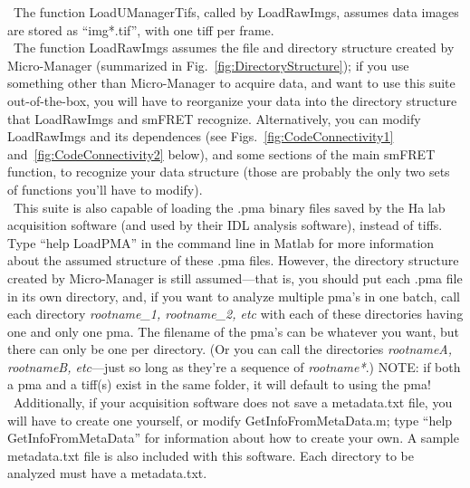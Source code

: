 \documentclass[11pt]{article}
\begin{document}
\noindent \textbullet~The function LoadUManagerTifs, called by LoadRawImgs, assumes data images are stored as ``img*.tif'', with one tiff per frame.\\

\noindent \textbullet~The function LoadRawImgs assumes the file and directory structure created by Micro-Manager (summarized in Fig.~\ref{fig:DirectoryStructure}); if you use something other than Micro-Manager to acquire data, and want to use this suite out-of-the-box, you will have to reorganize your data into the directory structure that LoadRawImgs and smFRET recognize.  Alternatively, you can modify LoadRawImgs and its dependences (see Figs.~\ref{fig:CodeConnectivity1} and~\ref{fig:CodeConnectivity2} below), and some sections of the main smFRET function, to recognize your data structure (those are probably the only two sets of functions you'll have to modify).  \\

\noindent \textbullet~This suite is also capable of loading the .pma binary files saved by the Ha lab acquisition software (and used by their IDL analysis software), instead of tiffs.  Type ``help LoadPMA'' in the command line in Matlab for more information about the assumed structure of these .pma files.  However, the directory structure created by Micro-Manager is still assumed---that is, you should put each .pma file in its own directory, and, if you want to analyze multiple pma's in one batch, call each directory \textit{rootname\_1, rootname\_2, etc} with each of these directories having one and only one pma.  The filename of the pma's can be whatever you want, but there can only be one per directory. (Or you can call the directories \textit{rootnameA, rootnameB, etc}---just so long as they're a sequence of \textit{rootname*}.) NOTE: if both a pma and a tiff(s) exist in the same folder, it will default to using the pma! \\

\noindent \textbullet~Additionally, if your acquisition software does not save a metadata.txt file, you will have to create one yourself, or modify GetInfoFromMetaData.m; type ``help GetInfoFromMetaData'' for information about how to create your own.  A sample metadata.txt file is also included with this software.  Each directory to be analyzed must have a metadata.txt.\\ 
\end{document}
